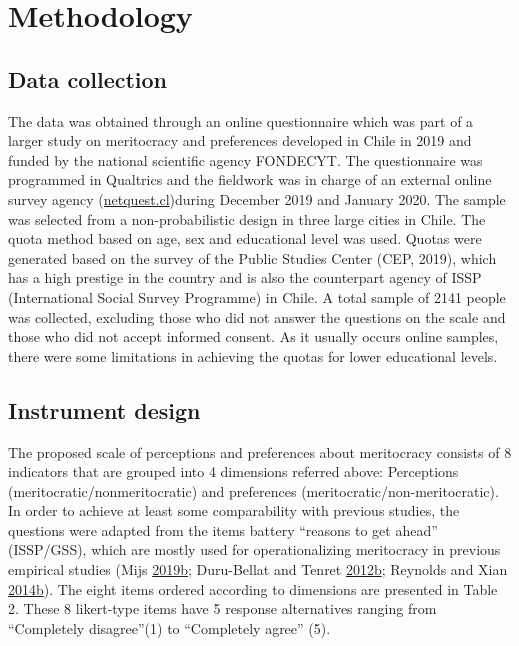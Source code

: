 \documentclass[
]{article}
\begin{document}
\hypertarget{methodology}{%
\section{Methodology}\label{methodology}}

\hypertarget{data-collection}{%
\subsection{Data collection}\label{data-collection}}

The data was obtained through an online questionnaire which was part of
a larger study on meritocracy and preferences developed in Chile in 2019
and funded by the national scientific agency FONDECYT. The questionnaire
was programmed in Qualtrics and the fieldwork was in charge of an
external online survey agency
(\href{www.netquest.cl}{netquest.cl})during December 2019 and January
2020. The sample was selected from a non-probabilistic design in three
large cities in Chile. The quota method based on age, sex and
educational level was used. Quotas were generated based on the survey of
the Public Studies Center (CEP, 2019), which has a high prestige in the
country and is also the counterpart agency of ISSP (International Social
Survey Programme) in Chile. A total sample of 2141 people was collected,
excluding those who did not answer the questions on the scale and those
who did not accept informed consent. As it usually occurs online
samples, there were some limitations in achieving the quotas for lower
educational levels.

\hypertarget{instrument-design}{%
\subsection{Instrument design}\label{instrument-design}}

The proposed scale of perceptions and preferences about meritocracy
consists of 8 indicators that are grouped into 4 dimensions referred
above: Perceptions (meritocratic/nonmeritocratic) and preferences
(meritocratic/non-meritocratic). In order to achieve at least some
comparability with previous studies, the questions were adapted from the
items battery ``reasons to get ahead'' (ISSP/GSS), which are mostly used
for operationalizing meritocracy in previous empirical studies (Mijs
\protect\hyperlink{ref-mijs_paradox_2019}{2019}\protect\hyperlink{ref-mijs_paradox_2019}{b};
Duru-Bellat and Tenret
\protect\hyperlink{ref-duru-bellat_whos_2012}{2012}\protect\hyperlink{ref-duru-bellat_whos_2012}{b};
Reynolds and Xian
\protect\hyperlink{ref-reynolds_perceptions_2014}{2014}\protect\hyperlink{ref-reynolds_perceptions_2014}{b}).
The eight items ordered according to dimensions are presented in Table
2. These 8 likert-type items have 5 response alternatives ranging from
``Completely disagree''(1) to ``Completely agree'' (5).
\end{document}
